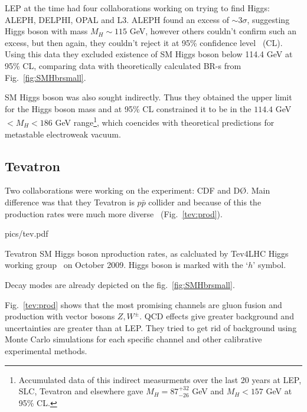 LEP at the time had four collaborations working on trying to find Higgs: ALEPH, DELPHI, OPAL and L3. ALEPH found an excess of
$\sim 3 \sigma$, suggesting Higgs boson with mass $M_H \sim 115$ GeV, however others couldn't confirm such an excess, but then
again, they couldn't reject it at 95\% confidence level~\cite{higgs:review} (CL). Using this data they excluded existence of
SM Higgs boson below 114.4 GeV at 95\% CL, comparing data with theoretically calculated BR-s from Fig.~\ref{fig:SMHbrsmall}.

\vspace{12pt}

SM Higgs boson was also sought indirectly. Thus they obtained the upper limit
for the Higgs boson mass and at 95\% CL constrained it to be in the $114.4$ GeV $< M_H < 186$ GeV range\footnote{Accumulated data
of this indirect measurments over the last 20 years at LEP, SLC, Tevatron and elsewhere gave $M_H = 87^{+32}_{-26}$ GeV and
$M_H < 157$ GeV at 95\% CL.}, which coencides with theoretical predictions for metastable electroweak vacuum.

\subsection{Tevatron}

Two collaborations were working on the experiment: CDF and D\O. Main difference was that they Tevatron is $p\bar{p}$ collider and
because of this the production rates were much more diverse~\cite{tev4lhc} (Fig.~\ref{tev:prod}).

\begin{myfig}[11cm]{pics/tev.pdf}
	\vspace{-12pt}
	\caption{Tevatron SM Higgs boson nproduction rates, as calcluated by Tev4LHC Higgs working group~\cite{tev4lhc} on October
		2009. Higgs boson is marked with the `$h$' symbol.}
	\label{tev:prod}
\end{myfig}

Decay modes are already depicted on the fig.~\ref{fig:SMHbrsmall}.

Fig.~\ref{tev:prod} shows that the most promising channels are gluon fusion and production with vector bosons $Z,W^\pm$. QCD effects
give greater background and uncertainties are greater than at LEP. They tried to get rid of background using Monte Carlo
simulations for each specific channel and other calibrative experimental methods.

